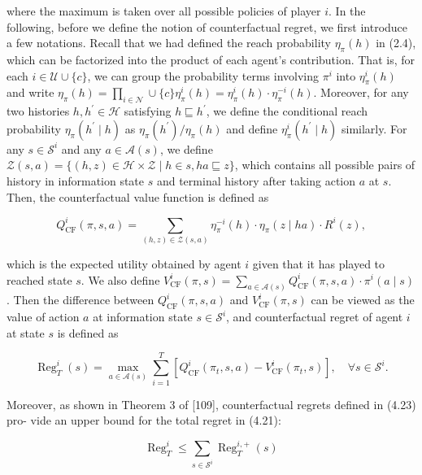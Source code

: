 \documentclass[10pt]{article}
\begin{document}
where the maximum is taken over all possible policies of player $i$. In the following, before we define the notion of counterfactual regret, we first introduce a few notations. Recall that we had defined the reach probability $\eta_{\pi}(h)$ in (2.4), which can be factorized into the product of each agent's contribution. That is, for each $i \in \mathcal{U} \cup\{c\}$, we can group the probability terms involving $\pi^{i}$ into $\eta_{\pi}^{i}(h)$ and write $\eta_{\pi}(h)=\prod_{i \in \mathcal{N}} \cup\{c\} \eta_{\pi}^{i}(h)=\eta_{\pi}^{i}(h) \cdot \eta_{\pi}^{-i}(h)$. Moreover, for any two histories $h, h^{\prime} \in \mathcal{H}$ satisfying $h \sqsubseteq h^{\prime}$, we define the conditional reach probability $\eta_{\pi}\left(h^{\prime} \mid h\right)$ as $\eta_{\pi}\left(h^{\prime}\right) / \eta_{\pi}(h)$ and define $\eta_{\pi}^{i}\left(h^{\prime} \mid h\right)$ similarly. For any $s \in \mathcal{S}^{i}$ and any $a \in \mathcal{A}(s)$, we define $\mathcal{Z}(s, a)=\{(h, z) \in \mathcal{H} \times \mathcal{Z} \mid h \in s, h a \sqsubseteq z\}$, which contains all possible pairs of history in information state $s$ and terminal history after taking action $a$ at $s$. Then, the counterfactual value function is defined as

\[
Q_{\mathrm{CF}}^{i}(\pi, s, a)=\sum_{(h, z) \in \mathcal{Z}(s, a)} \eta_{\pi}^{-i}(h) \cdot \eta_{\pi}(z \mid h a) \cdot R^{i}(z),
\]

which is the expected utility obtained by agent $i$ given that it has played to reached state $s$. We also define $V_{\mathrm{CF}}^{i}(\pi, s)=\sum_{a \in \mathcal{A}(s)} Q_{\mathrm{CF}}^{i}(\pi, s, a) \cdot \pi^{i}(a \mid s)$. Then the difference between $Q_{\mathrm{CF}}^{i}(\pi, s, a)$ and $V_{\mathrm{CF}}^{i}(\pi, s)$ can be viewed as the value of action $a$ at information state $s \in \mathcal{S}^{i}$, and counterfactual regret of agent $i$ at state $s$ is defined as

\[
\operatorname{Reg}_{T}^{i}(s)=\max _{a \in \mathcal{A}(s)} \sum_{i=1}^{T}\left[Q_{\mathrm{CF}}^{i}\left(\pi_{t}, s, a\right)-V_{\mathrm{CF}}^{i}\left(\pi_{t}, s\right)\right], \quad \forall s \in \mathcal{S}^{i} .
\]

Moreover, as shown in Theorem 3 of [109], counterfactual regrets defined in (4.23) pro- vide an upper bound for the total regret in (4.21):

\[
\operatorname{Reg}_{T}^{i} \leq \sum_{s \in \mathcal{S}^{i}} \operatorname{Reg}_{T}^{i,+}(s)
\]
\end{document}
